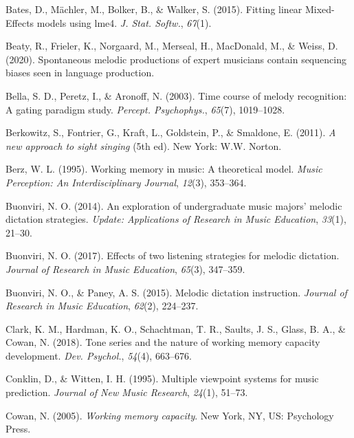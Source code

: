 \documentclass[english,man,floatsintext]{apa6}
\begin{document}
\leavevmode\hypertarget{ref-Bates2015-gm}{}%
Bates, D., Mächler, M., Bolker, B., \& Walker, S. (2015). Fitting linear Mixed-Effects models using lme4. \emph{J. Stat. Softw.}, \emph{67}(1).

\leavevmode\hypertarget{ref-Beaty2020-uu}{}%
Beaty, R., Frieler, K., Norgaard, M., Merseal, H., MacDonald, M., \& Weiss, D. (2020). Spontaneous melodic productions of expert musicians contain sequencing biases seen in language production.

\leavevmode\hypertarget{ref-Bella2003-cy}{}%
Bella, S. D., Peretz, I., \& Aronoff, N. (2003). Time course of melody recognition: A gating paradigm study. \emph{Percept. Psychophys.}, \emph{65}(7), 1019--1028.

\leavevmode\hypertarget{ref-Berkowitz2011-hi}{}%
Berkowitz, S., Fontrier, G., Kraft, L., Goldstein, P., \& Smaldone, E. (2011). \emph{A new approach to sight singing} (5th ed). New York: W.W. Norton.

\leavevmode\hypertarget{ref-Berz1995-lu}{}%
Berz, W. L. (1995). Working memory in music: A theoretical model. \emph{Music Perception: An Interdisciplinary Journal}, \emph{12}(3), 353--364.

\leavevmode\hypertarget{ref-Buonviri2014-ch}{}%
Buonviri, N. O. (2014). An exploration of undergraduate music majors' melodic dictation strategies. \emph{Update: Applications of Research in Music Education}, \emph{33}(1), 21--30.

\leavevmode\hypertarget{ref-Buonviri2017-gp}{}%
Buonviri, N. O. (2017). Effects of two listening strategies for melodic dictation. \emph{Journal of Research in Music Education}, \emph{65}(3), 347--359.

\leavevmode\hypertarget{ref-Buonviri2015-qe}{}%
Buonviri, N. O., \& Paney, A. S. (2015). Melodic dictation instruction. \emph{Journal of Research in Music Education}, \emph{62}(2), 224--237.

\leavevmode\hypertarget{ref-Clark2018-mr}{}%
Clark, K. M., Hardman, K. O., Schachtman, T. R., Saults, J. S., Glass, B. A., \& Cowan, N. (2018). Tone series and the nature of working memory capacity development. \emph{Dev. Psychol.}, \emph{54}(4), 663--676.

\leavevmode\hypertarget{ref-Conklin1995-qk}{}%
Conklin, D., \& Witten, I. H. (1995). Multiple viewpoint systems for music prediction. \emph{Journal of New Music Research}, \emph{24}(1), 51--73.

\leavevmode\hypertarget{ref-Cowan2005-vx}{}%
Cowan, N. (2005). \emph{Working memory capacity}. New York, NY, US: Psychology Press.
\end{document}
